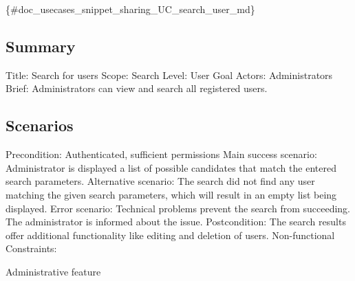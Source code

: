 \{\#doc\+\_\+usecases\+\_\+snippet\+\_\+sharing\+\_\+\+U\+C\+\_\+search\+\_\+user\+\_\+md\}

\subsection*{Summary}

Title\+: Search for users Scope\+: Search Level\+: User Goal Actors\+: Administrators Brief\+: Administrators can view and search all registered users.

\subsection*{Scenarios}

Precondition\+: Authenticated, sufficient permissions Main success scenario\+: Administrator is displayed a list of possible candidates that match the entered search parameters. Alternative scenario\+: The search did not find any user matching the given search parameters, which will result in an empty list being displayed. Error scenario\+: Technical problems prevent the search from succeeding. The administrator is informed about the issue. Postcondition\+: The search results offer additional functionality like editing and deletion of users. Non-\/functional Constraints\+:
\begin{DoxyItemize}
\item Administrative feature 
\end{DoxyItemize}